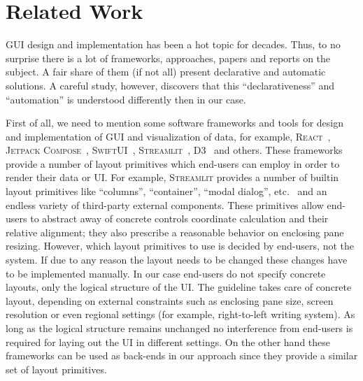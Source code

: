 
\section{Related Work}
\label{related}

GUI design and implementation has been a hot topic for decades. Thus, to no surprise there is a lot of frameworks, approaches, papers
and reports on the subject. A fair share of them (if not all) present declarative and automatic solutions. A careful study, however,
discovers that this ``declarativeness'' and ``automation'' is understood differently then in our case.

First of all, we need to mention some software frameworks and tools for design and implementation of GUI and visualization of data, for example, \textsc{React}~\cite{react},
\textsc{Jetpack Compose}~\cite{Jetpack}, \textsc{SwiftUI}~\cite{SwiftUI}, \textsc{Streamlit}~\cite{Streamlit}, \textsc{D3}~\cite{D3} and others.
These frameworks provide a number of layout primitives which end-users can employ in order to render their data or UI. For example, \textsc{Streamlit}
provides a number of builtin layout primitives like ``columns'', ``container'', ``modal dialog'', etc.~\cite{StreamlitLayout} and an endless
variety of third-party external components. These primitives allow end-users to abstract away of concrete controls coordinate calculation and their
relative alignment; they also prescribe a reasonable behavior on enclosing pane resizing. However, which layout primitives to use is decided by
end-users, not the system. If due to any reason the layout needs to be changed these changes have to be implemented manually. In our case
end-users do not specify concrete layouts, only the logical structure of the UI. The guideline takes care of concrete layout, depending on
external constraints such as enclosing pane size, screen resolution or even regional settings (for example, right-to-left writing system). As long
as the logical structure remains unchanged no interference from end-users is required for laying out the UI in different settings. On the
other hand these frameworks can be used as back-ends in our approach since they provide a similar set of layout primitives.

